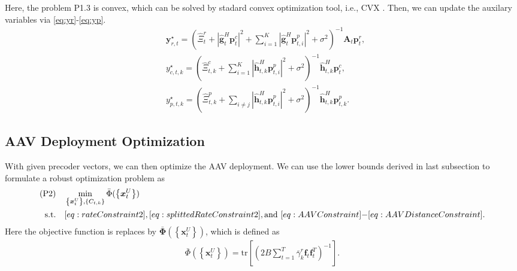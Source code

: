 \documentclass[twocolumn,journal]{IEEEtran}
\begin{document}
Here, the problem P1.3 is convex, which can be solved by stadard convex optimization tool, i.e., CVX \cite{cvx}. Then, we can update the auxilary variables via \eqref{eq:yr}-\eqref{eq:yp}. 
\begin{subequations}
\begin{align}
    &\boldsymbol{y}_{r,t}^{\star} = \left(\hat{\Xi}^{r}_{t} + \left| \hat{\boldsymbol{g}}^{H}_{t}\boldsymbol{p}^{c}_{t}\right|^2 + \sum_{i=1}^{K}\left| \hat{\boldsymbol{g}}^{H}_{t}\boldsymbol{p}^{p}_{t,i}\right|^2 + \sigma^2\right)^{-1}\mathbf{A}_t\boldsymbol{p}^{r}_{t},\label{eq:yr}\\
    &y_{c,t,k}^{\star} = \left( \hat{\Xi}^{c}_{t,k} +  \sum_{i=1}^{K}\left| \hat{\boldsymbol{h}}^{H}_{t,k}\boldsymbol{p}^{p}_{t,i}\right|^2 + \sigma^2 \right)^{-1}\hat{\boldsymbol{h}}^{H}_{t,k}\boldsymbol{p}^{c}_{t},\label{eq:yc}\\
    &y_{p,t,k}^{\star} = \left( \hat{\Xi}^{p}_{t,k} +  \sum_{i\neq j}\left| \hat{\boldsymbol{h}}^{H}_{t,k}\boldsymbol{p}^{p}_{t,i}\right|^2 + \sigma^2  \right)^{-1}\hat{\boldsymbol{h}}^{H}_{t,k}\boldsymbol{p}^{p}_{t,k}.\label{eq:yp}
\end{align}
\end{subequations}
\subsection{AAV Deployment Optimization}
With given precoder vectors, we can then optimize the AAV deployment. We can use the lower bounds derived in last subsection to formulate a robust optimization problem as 
\begin{align}
    (\text{P2})\quad&\min_{\left\{\boldsymbol{x}^{U}_{t}\right\},\left\{C_{t,k}\right\}} \bar{{\Phi}}(\left\{\boldsymbol{x}^{U}_{t}\right\})\label{eq:objP2}\\
    \text{s.t.}\quad& \eqref{eq:rateConstraint2}, \eqref{eq:splittedRateConstraint2}, \text{and } \eqref{eq:AAVConstraint}\mbox{-}\eqref{eq:AAVDistanceConstraint}.\notag
\end{align}
Here the objective function is replaces by \(\bar{\mathbf{\Phi}}(\left\{\boldsymbol{x}^{U}_{t}\right\})\), which is defined as
\begin{align}
    \bar{{\Phi}}(\left\{\boldsymbol{x}^{U}_{t}\right\}) = \text{tr}\left[\left(2B\sum_{t=1}^{T} \bar{\gamma}_{k}^{r}\boldsymbol{f}_{t}\boldsymbol{f}^{T}_{t}\right)^{-1}\right].
\end{align}
\end{document}
